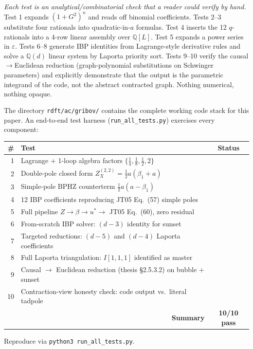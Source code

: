 \documentclass[11pt,a4paper]{article}
\theoremstyle{definition}
\theoremstyle{plain}
\begin{document}
\begin{codebox}
\emph{Each test is an analytical/combinatorial check that a reader
could verify by hand.}  Test 1 expands $(1+G^2)^n$ and reads off
binomial coefficients.  Tests 2--3 substitute four rationals into
quadratic-in-$a$ formulas.  Test 4 inserts the 12 $q$-rationals into
a 4-row linear assembly over $\mathbb{Q}[L]$.  Test 5 expands a
power series in $\varepsilon$.  Tests 6--8 generate IBP identities
from Lagrange-style derivative rules and solve a $\mathbb{Q}(d)$
linear system by Laporta priority sort.  Tests 9--10 verify the
causal$\to$Euclidean reduction (graph-polynomial substitutions on
Schwinger parameters) and explicitly demonstrate that the output is
the parametric integrand of the code, not the abstract contracted
graph.  Nothing numerical, nothing opaque.

The directory \texttt{rdft/ac/gribov/} contains the complete working
code stack for this paper.  An end-to-end test harness
(\texttt{run\_all\_tests.py}) exercises every component:
\begin{center}\small
\begin{tabular}{@{}rlc@{}}
\toprule
\# & Test & Status \\
\midrule
1 & Lagrange + 1-loop algebra factors $\{\tfrac14, \tfrac18, \tfrac12, 2\}$ & \checkmark\\
2 & Double-pole closed form $Z_X^{(2,2)} = \tfrac12 a(\beta_1{+}a)$ & \checkmark\\
3 & Simple-pole BPHZ counterterm $\tfrac12 a(a{-}\beta_1)$            & \checkmark\\
4 & 12 IBP coefficients reproducing JT05 Eq.~(57) simple poles        & \checkmark\\
5 & Full pipeline $Z \to \beta \to u^* \to$ JT05 Eq.~(60), zero residual & \checkmark\\
6 & From-scratch IBP solver: $(d-3)$ identity for sunset              & \checkmark\\
7 & Targeted reductions: $(d-5)$ and $(d-4)$ Laporta coefficients     & \checkmark\\
8 & Full Laporta triangulation: $I[1,1,1]$ identified as master       & \checkmark\\
9 & Causal $\to$ Euclidean reduction (thesis \S 2.5.3.2) on bubble + sunset & \checkmark\\
10 & Contraction-view honesty check: code output vs.\ literal tadpole & \checkmark\\
\midrule
\multicolumn{2}{r}{\bfseries Summary} & \textbf{10/10 pass} \\
\bottomrule
\end{tabular}
\end{center}
Reproduce via \texttt{python3 run\_all\_tests.py}.
\end{codebox}
\end{document}

